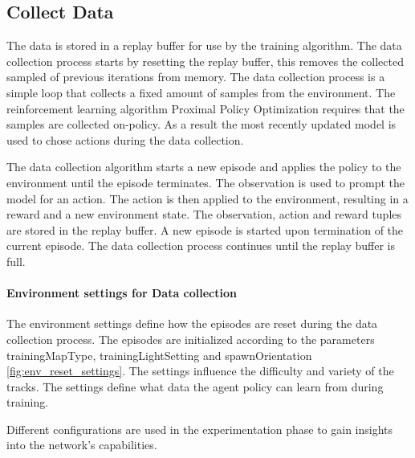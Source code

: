 \subsection{Collect Data}

The data is stored in a replay buffer for use by the training algorithm. The data collection process starts by resetting the replay buffer, this removes the collected sampled of previous iterations from memory.
The data collection process is a simple loop that collects a fixed amount of samples from the environment. The reinforcement learning algorithm Proximal Policy Optimization requires that the samples are collected on-policy. As a result the most recently updated model is used to chose actions during the data collection. 

The data collection algorithm starts a new episode and applies the policy to the environment until the episode terminates. The observation is used to prompt the model for an action. The action is then applied to the environment, resulting in a reward and a new environment state. The observation, action and reward tuples are stored in the replay buffer. A new episode is started upon termination of the current episode. The data collection process continues until the replay buffer is full.

\paragraph{Environment settings for Data collection}

The environment settings define how the episodes are reset during the data collection process. The episodes are initialized according to the parameters trainingMapType, trainingLightSetting and spawnOrientation \ref{fig:env_reset_settings}. The settings influence the difficulty and variety of the tracks. The settings define what data the agent policy can learn from during training.

Different configurations are used in the experimentation phase to gain insights into the network's capabilities.


